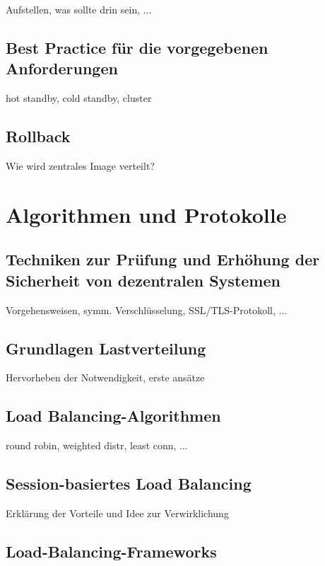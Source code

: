 \documentclass[letterpaper, 12pt]{article}
\let\tempsection\section
\renewcommand\section[1]{\vspace{-0.3cm}\tempsection{#1}\vspace{-0.3cm}}
\let\tempsubsection\subsection
\renewcommand\subsection[1]{\vspace{0cm}\tempsubsection{#1}\vspace{0cm}}
\begin{document}
Aufstellen, was sollte drin sein, ...

\subsection{Best Practice für die vorgegebenen Anforderungen}

hot standby, cold standby, cluster

\subsection{Rollback}

Wie wird zentrales Image verteilt?

\clearpage

\section{Algorithmen und Protokolle}

\subsection{Techniken zur Prüfung und Erhöhung der Sicherheit von dezentralen Systemen}

Vorgehensweisen, symm. Verschlüsselung, SSL/TLS-Protokoll, ...

\subsection{Grundlagen Lastverteilung}

Hervorheben der Notwendigkeit, erste ansätze

\subsection{Load Balancing-Algorithmen}

round robin, weighted distr, least conn, ...

\subsection{Session-basiertes Load Balancing}

Erklärung der Vorteile und Idee zur Verwirklichung

\subsection{Load-Balancing-Frameworks}
\end{document}
